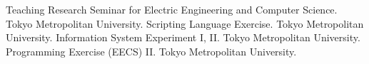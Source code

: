 \begin{rubric}{Teaching}
  \entry*[2024] Research Seminar for Electric Engineering and Computer Science. Tokyo Metropolitan University.
  \entry*[2024] Scripting Language Exercise. Tokyo Metropolitan University.
  \entry*[2024] Information System Experiment I, II. Tokyo Metropolitan University.
  \entry*[2024] Programming Exercise (EECS) II. Tokyo Metropolitan University.
\end{rubric}
